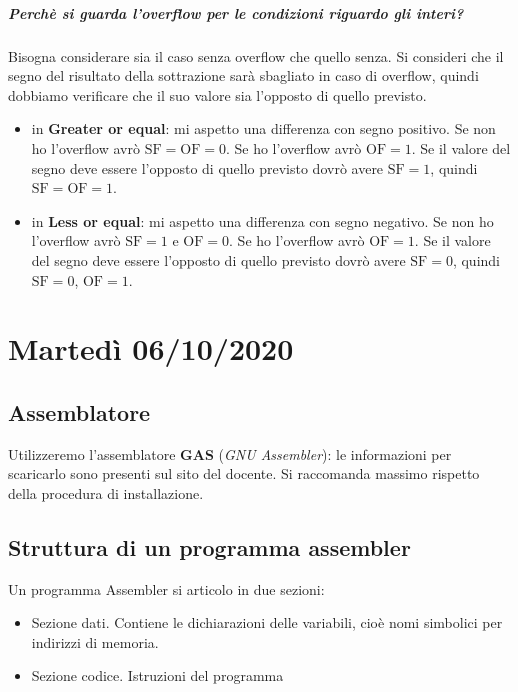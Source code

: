 \documentclass[11pt]{report}
\begin{document}
\paragraph{Perchè si guarda l'overflow per le condizioni riguardo gli interi?} Bisogna considerare sia il caso senza overflow che quello senza. Si consideri che il segno del risultato della sottrazione sarà sbagliato in caso di overflow, quindi dobbiamo verificare che il suo valore sia l'opposto di quello previsto.
\begin{itemize}
\item in \textbf{Greater or equal}: mi aspetto una differenza con segno positivo. Se non ho l'overflow avrò $\text{SF}=\text{OF}= 0$. Se ho l'overflow avrò $\text{OF}= 1$. Se il valore del segno deve essere l'opposto di quello previsto dovrò avere  $\text{SF}=1$, quindi $\text{SF}=\text{OF}= 1$.
\item in \textbf{Less or equal}: mi aspetto una differenza con segno negativo. Se non ho l'overflow avrò $\text{SF}=1$ e $\text{OF}=0$. Se ho l'overflow avrò $\text{OF}= 1$. Se il valore del segno deve essere l'opposto di quello previsto dovrò avere  $\text{SF}=0$, quindi $\text{SF}=0$, $\text{OF}= 1$.
\end{itemize}
\chapter{Martedì 06/10/2020}

\section{Assemblatore} 
Utilizzeremo l'assemblatore \textbf{GAS} (\emph{GNU Assembler}): le informazioni per scaricarlo sono presenti sul sito del docente. Si raccomanda massimo rispetto della procedura di installazione.
\section{Struttura di un programma assembler}
Un programma Assembler si articolo in due sezioni:
\begin{itemize}
\item Sezione dati. Contiene le dichiarazioni delle variabili, cioè nomi simbolici per indirizzi di memoria.
\item Sezione codice. Istruzioni del programma
\end{itemize}
\end{document}
